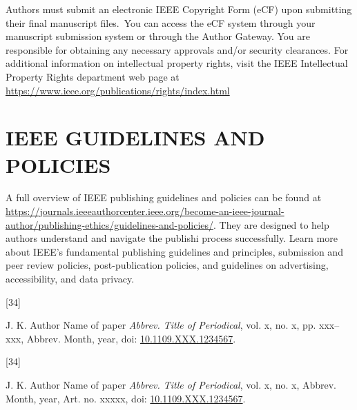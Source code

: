 \documentclass[correspondence]{IEEEtaes}
\begin{document}
Authors must submit an electronic IEEE Copyright Form (eCF) upon submitting their final manuscript files.~You can access the eCF system through your manuscript submission system or through the Author Gateway. You are responsible for obtaining any necessary approvals and/or security clearances. For additional information on intellectual property rights, visit the IEEE Intellectual Property Rights department web page at \href{https://www.ieee.org/publications/rights/index.html}{https://www.ieee.org/publications/rights/index.html}

\section{IEEE GUIDELINES AND POLICIES}

A full overview of IEEE publishing guidelines and policies can be found
at \href{https://journals.ieeeauthorcenter.ieee.org/become-an-ieee-journal-author/publishing-ethics/guidelines-and-policies/}{\url{https://journals.ieeeauthorcenter.ieee.org/become-an-ieee-journal-author/publishing-ethics/guidelines-and-policies/}}. They are designed to help authors understand and navigate the publishi process successfully. Learn more about IEEE's fundamental publishing guidelines and principles, submission and peer review policies, post-publication policies, and guidelines on advertising, accessibility, and data privacy.

\correspauthor%


\vspace*{-12pt}
\def\refname{}
\begin{thebibliography}{[34]}
\item[]  J. K. Author
\newblock Name of paper
\newblock \emph{Abbrev. Title of Periodical}, vol. x, no. x, pp. xxx--xxx, Abbrev. Month, year, doi: \href{https://dx.doi.org/10.1109.XXX.1234567}{10.1109.XXX.1234567}.
\end{thebibliography}

\def\refname{}
\begin{thebibliography}{[34]}\vspace*{-12pt}
\item[] J. K. Author
\newblock Name of paper
\newblock \emph{Abbrev. Title of Periodical}, vol. x, no. x, Abbrev. Month, year, Art. no. xxxxx, doi: \href{https://dx.doi.org/10.1109.XXX.1234567}{10.1109.XXX.1234567}.
\end{thebibliography}
\end{document}
